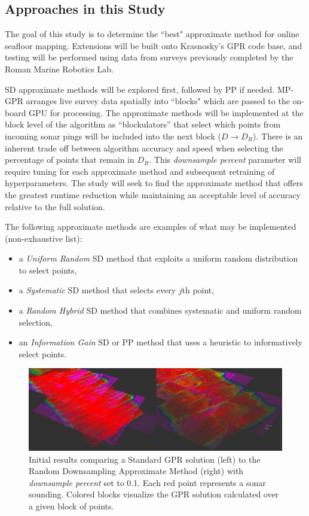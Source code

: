 \documentclass{article}
\begin{document}
\subsection{Approaches in this Study}
The goal of this study is to determine the ``best" approximate method for online seafloor mapping. Extensions will be built onto Krasnosky's GPR code base, and testing will be performed using data from surveys previously completed by the Roman Marine Robotics Lab. 

SD approximate methods will be explored first, followed by PP if needed. MP-GPR arranges live survey data spatially into ``blocks" which are passed to the on-board GPU for processing. The approximate methods will be implemented at the block level of the algorithm as ``blockulators'' that select which points from incoming sonar pings will be included into the next block ($D \rightarrow D_R$). There is an inherent trade off between algorithm accuracy and speed when selecting the percentage of points that remain in $D_R$. This \textit{downsample percent} parameter will require tuning for each approximate method and subsequent retraining of hyperparameters. The study will seek to find the approximate method that offers the greatest runtime reduction while maintaining an acceptable level of accuracy relative to the full solution. 

The following approximate methods are examples of what may be implemented (non-exhaustive list):

\begin{itemize}[noitemsep]
    \item a \textit{Uniform Random} SD method that exploits a uniform random distribution to select points,
    \item a \textit{Systematic} SD method that selects every $j$th point,
    \item a \textit{Random Hybrid} SD method that combines systematic and uniform random selection,
    \item an \textit{Information Gain} SD or PP method that uses a heuristic to informatively select points.
\end{itemize}

\begin{figure}[htp]
    \centering
    \includegraphics[width=15
    cm]{GPR_comparison_Fullto10.png} %
    \caption[Standard vs. Downsample]{Initial results comparing a Standard GPR solution (left) to the Random Downsampling Approximate Method (right) with \textit{downsample percent} set to 0.1. Each red point represents a sonar sounding. Colored blocks visualize the GPR solution calculated over a given block of points.} 
    \label{fig: a10} %
\end{figure}
\end{document}
